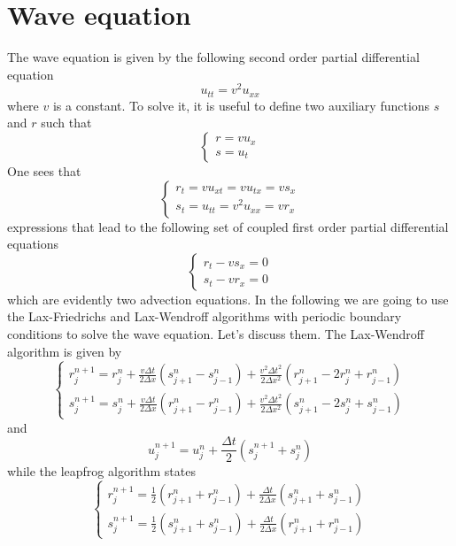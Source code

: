 \documentclass[11pt,a4paper]{article}
\begin{document}
\section{Wave equation}
The wave equation is given by the following second order partial differential equation
\begin{equation}
u_{tt} = v^2 u_{xx}
\end{equation}
where $v$ is a constant. To solve it, it is useful to define two auxiliary functions $s$ and $r$ such that
\begin{equation}
\begin{cases}
r = vu_x \\
s = u_t
\end{cases}
\end{equation}
One sees that
 \[
 \begin{cases}
r_t = vu_{xt} = vu_{tx} = vs_x \\
s_t = u_{tt} = v^2 u_{xx} = vr_x
\end{cases}
 \]
expressions that lead to the following set of coupled first order partial differential equations
\begin{equation}
 \begin{cases}
r_t -vs_x = 0 \\
s_t -  vr_x = 0
\end{cases}
\end{equation}
which are evidently two advection equations. In the following we are going to use the Lax-Friedrichs and Lax-Wendroff algorithms with periodic boundary conditions to solve the wave equation. Let's discuss them. The Lax-Wendroff algorithm is given by
\begin{equation}
 \begin{cases}
r_j^{n+1} = r^n_j + \frac{v \Delta t}{2 \Delta x} \left( s_{j+1}^n - s_{j-1}^n \right) + \frac{v^2 \Delta t^2}{2 \Delta x^2} ( r^n_{j+1} - 2r_j^n + r_{j-1}^n ) \\
s_j^{n+1} = s^n_j + \frac{v \Delta t}{2 \Delta x} \left( r_{j+1}^n - r_{j-1}^n \right) + \frac{v^2 \Delta t^2}{2 \Delta x^2} ( s^n_{j+1} - 2s_j^n + s_{j-1}^n ) 
\end{cases}
\end{equation}
and
\begin{equation}
u_j^{n+1} = u_j^n + \frac{\Delta t}{2} ( s_j^{n+1} + s_j^n )
\end{equation}
while the leapfrog algorithm states
\begin{equation}
 \begin{cases}
r_j^{n+1} = \frac{1}{2}(r_{j+1}^n + r_{j-1}^n) + \frac{\Delta t}{2 \Delta x}(s_{j+1}^n + s_{j-1}^n) \\
s_j^{n+1} = \frac{1}{2}(s_{j+1}^n + s_{j-1}^n) + \frac{\Delta t}{2 \Delta x}(r_{j+1}^n + r_{j-1}^n)
\end{cases}
\end{equation}
\end{document}
